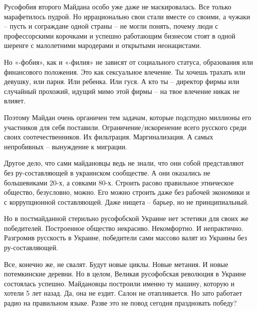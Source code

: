 Русофобия второго Майдана особо уже даже не маскировалась. Все только
марафетилось пудрой. Но иррационально свои стали вместе со своими, а чужаки –
пусть и сограждане одной страны – не могли понять, почему люди с профессорскими
корочками и успешно работающим бизнесом стоят в одной шеренге с малолетними
мародерами и открытыми неонацистами.

Но «-фобия», как и «-филия» не зависят от социального статуса, образования или
финансового положения. Это как сексуальное влечение. Ты хочешь трахать или
девушку, или парня. Или ребенка. Или гуся. А кто ты – директор фирмы или
случайный прохожий, идущий мимо этой фирмы – на твое влечение никак не влияет.

Поэтому Майдан очень органичен тем задачам, которые подспудно миллионы его
участников для себя поставили. Ограничение/искоренение всего русского среди
своих соотечественников. Их фильтрация. Маргинализация. А самых непробивных –
вынуждение к миграции.

Другое дело, что сами майдановцы ведь не знали, что они собой представляют без
ру-составляющей в украинском сообществе. А они оказались не большевиками 20-х,
а совками 80-х. Строить расово правильное этническое общество, безусловно,
можно. Его можно строить даже без рабочей экономики и с коррупционной
составляющей. Даже нищета – барьер, но не принципиальный.

Но в постмайданной стерильно русофобской Украине нет эстетики для своих же
победителей. Построенное общество некрасиво. Некомфортно. И непрактично.
Разгромив русскость в Украине, победители сами массово валят из Украины без
ру-составляющей.

Все, конечно же, не свалят. Будут новые циклы. Новые метания. И новые
потемкинские деревни. Но в целом, Великая русофобская революция в Украине
состоялась успешно. Майдановцы построили именно ту машину, которую и хотели 5
лет назад. Да, она не ездит. Салон не отапливается. Но зато работает радио на
правильном языке. Разве это не повод сегодня праздновать победу?

